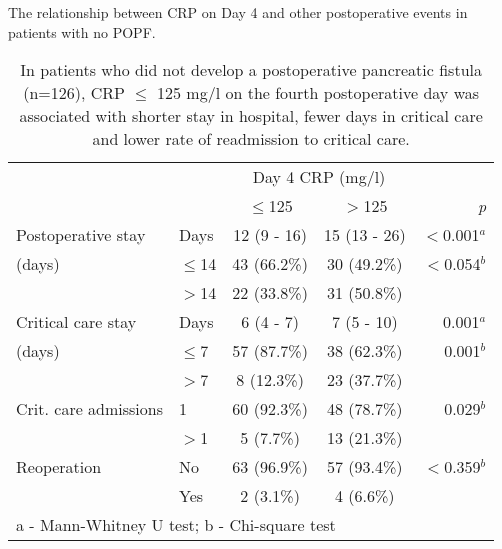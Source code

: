 \begin{table}[p]
	\centering
	\caption{The relationship between CRP on Day 4 and other postoperative events in patients with no POPF.}
	\label{table:crp_comp_CRP4_vs_LOS}
	\renewcommand{\arraystretch}{1.4} %
	\setlength{\tabcolsep}{9pt} %
	\begin{tabular}{|l l  c c r |}
		\hline
		                      &          & \multicolumn{2}{c}{Day 4 CRP (mg/l)} &  \\
		                      &          & $\leq$125   & $>$125                   & \textit{p}   \\ \hline
		Postoperative stay    & Days     & 12 (9 - 16) & 15 (13 - 26)             & $<$0.001$^a$ \\
		(days)                & $\leq$14 & 43 (66.2\%) & 30 (49.2\%)              & $<$0.054$^b$ \\
		                      & $>$14    & 22 (33.8\%) & 31 (50.8\%)              &  \\
		Critical care stay    & Days     & 6 (4 - 7)   & 7 (5 - 10)               & 0.001$^a$    \\
		(days)                & $\leq$7  & 57 (87.7\%) & 38 (62.3\%)              & 0.001$^b$    \\
		                      & $>$7     & 8 (12.3\%)  & 23 (37.7\%)              &  \\
		Crit. care admissions & 1        & 60 (92.3\%) & 48 (78.7\%)              & 0.029$^b$    \\
		                      & $>$1     & 5 (7.7\%)   & 13 (21.3\%)              &  \\
		Reoperation           & No       & 63 (96.9\%) & 57 (93.4\%)              & $<$0.359$^b$ \\
		                      & Yes      & 2 (3.1\%)   & 4 (6.6\%)                &  \\ \hline
		\multicolumn{5}{l}{a - Mann-Whitney U test; b - Chi-square test}
	\end{tabular}
	\medskip
	\caption*{In patients who did not develop a postoperative pancreatic fistula (n=126), CRP $\leq$ 125 mg/l on the fourth postoperative day was associated with shorter stay in hospital, fewer days in critical care and lower rate of readmission to critical care.}
\end{table}



